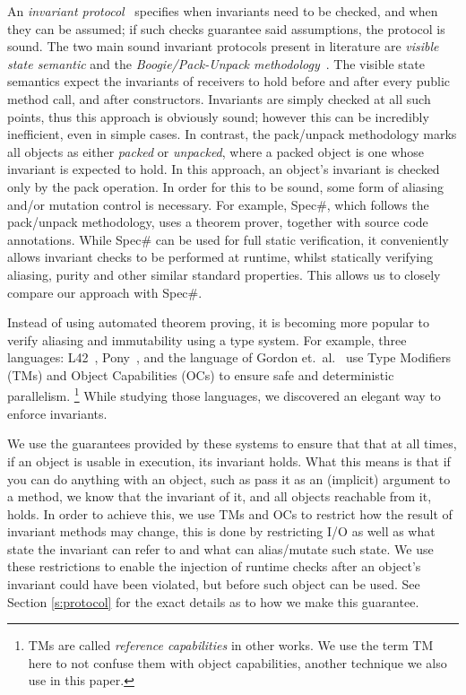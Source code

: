 An \emph{invariant protocol}~\cite{FlexibleInvariants} specifies when invariants need to be checked, and when they can be assumed; if such checks guarantee said assumptions, the protocol is sound.
The two main sound invariant protocols present in literature are \emph{visible state semantic} \cite{Meyer:1988:OSC:534929} and the \emph{Boogie/Pack-Unpack methodology}~\cite{DBLP:journals/jot/BarnettDFLS04}. The visible state semantics expect the invariants of receivers to hold before and after every public method call, and after constructors. Invariants are simply checked at all such points, thus this approach is obviously sound; however this can be incredibly inefficient, even in simple cases.
In contrast, the pack/unpack methodology marks all objects as either \emph{packed} or \emph{unpacked}, where a packed object is one whose invariant is expected to hold.
In this approach, an object's invariant is checked only by the pack operation.
In order for this to be sound, some form of aliasing and/or mutation control is necessary. For example, Spec\#, which follows the pack/unpack methodology, uses a theorem prover, together with source code annotations.
While Spec\# can be used for full static verification, it conveniently allows invariant checks to be performed
at runtime, 
whilst statically verifying aliasing, purity and other similar standard properties.
This allows us to closely compare our approach with Spec\#.

Instead of using automated theorem proving, 
it is becoming more popular to verify aliasing and immutability using a type system.
For example, three languages: L42~\cite{ServettoZucca15,ServettoEtAl13a,JOT:issue_2011_01/article1,GianniniEtAl16}, Pony~\cite{clebsch2015deny,clebsch2017orca}, and the language of Gordon et.~al.~\cite{GordonEtAl12} use Type Modifiers (TMs) and Object Capabilities (OCs) to ensure safe and deterministic parallelism.%
\footnote{TMs are called \emph{reference capabilities} in other works. We use the term TM here
to not confuse them with object capabilities, another technique we also use in this paper.}
While studying those languages, we discovered an elegant way to enforce invariants.

We use the guarantees provided by these systems to ensure that that at all times, if an object is usable in execution, its invariant holds. What this means is that if you can do anything with an object, such as pass it as an (implicit) argument to a method, we know that the invariant of it, and all objects reachable from it, holds. In order to achieve this, we use TMs and OCs to restrict how the result of invariant methods may change, this is done by restricting I/O as well as what state the invariant can refer to and what can alias/mutate such state.  We use these restrictions to enable the injection of runtime checks after an object’s invariant could have been violated, but before such object can be used. See Section \ref{s:protocol} for the exact details as to how we make this guarantee.

